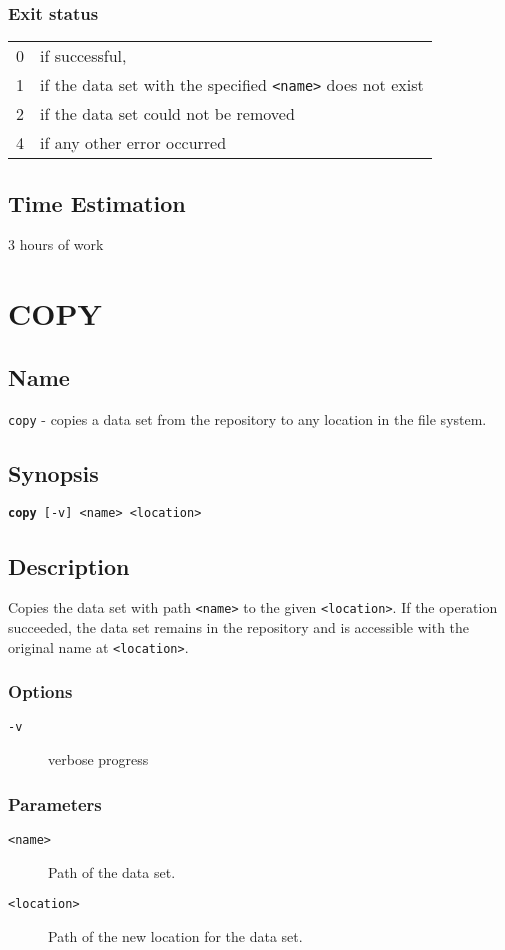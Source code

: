 \documentclass{article} %
\begin{document}
		\subsubsection*{Exit status}
		\begin{tabular}{ll}
			0 &  if successful,\\ 
			1 &  if the data set with the specified \texttt{<name>} does not exist\\ 
			2 &  if the data set could not be removed\\
			4 &  if any other error occurred\\
		\end{tabular}
				\subsection*{Time Estimation}
				3 hours of work \\
				\noindent
		\newpage
		\section*{COPY}
		\subsection*{Name}
		\texttt{copy} - copies a data set from the repository to any location in the file system.
		\subsection*{Synopsis}
		\texttt{\textbf{copy} [-v] <name> <location>}
		\subsection*{Description}
		Copies the data set with path \texttt{<name>} to the given \texttt{<location>}.
		If the operation succeeded, the data set remains in the repository and is accessible with the original name at  \texttt{<location>}.\\
		
		\noindent
		\subsubsection*{Options}
		\begin{description}
			\item[\texttt{-v}] verbose progress
		\end{description}
		
		\subsubsection*{Parameters}
		\begin{description}
			\item[\texttt{<name>}]  Path of the data set.
			\item[\texttt{<location>}] Path of the new location for the data set.
		\end{description}
\end{document}
